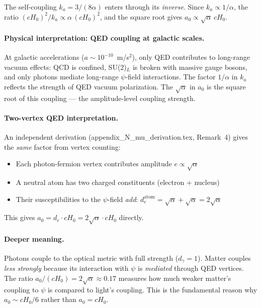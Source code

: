\documentclass[12pt,a4paper]{article}
\newcommand{\Hzero}{H_0}
\begin{document}
The self-coupling $k_a = 3/(8\alpha)$ enters through its \emph{inverse}.
Since $k_a \propto 1/\alpha$, the ratio $(c\Hzero)^2/k_a \propto \alpha\,(c\Hzero)^2$,
and the square root gives $a_0 \propto \sqrt{\alpha}\,c\Hzero$.

\paragraph{Physical interpretation: QED coupling at galactic scales.}
At galactic accelerations ($a \sim 10^{-10}$~m/s$^2$), only QED contributes
to long-range vacuum effects: QCD is confined, SU(2)$_L$ is broken with
massive gauge bosons, and only photons mediate long-range $\psi$-field
interactions. The factor $1/\alpha$ in $k_a$ reflects the strength of QED
vacuum polarization. The $\sqrt{\alpha}$ in $a_0$ is the square root of this
coupling --- the amplitude-level coupling strength.

\paragraph{Two-vertex QED interpretation.}
An independent derivation (appendix\_N\_mu\_derivation.tex, Remark~4)
gives the \emph{same} factor from vertex counting:
\begin{itemize}
\item Each photon-fermion vertex contributes amplitude $e \propto \sqrt{\alpha}$
\item A neutral atom has two charged constituents (electron + nucleus)
\item Their susceptibilities to the $\psi$-field \emph{add}:
  $d_e^{\mathrm{atom}} = \sqrt{\alpha} + \sqrt{\alpha} = 2\sqrt{\alpha}$
\end{itemize}

This gives $a_0 = d_e \cdot c\Hzero = 2\sqrt{\alpha} \cdot c\Hzero$ directly.

\paragraph{Deeper meaning.}
Photons couple to the optical metric with full strength ($d_\gamma = 1$).
Matter couples \emph{less strongly} because its interaction with $\psi$ is
\emph{mediated} through QED vertices. The ratio $a_0/(c\Hzero) = 2\sqrt{\alpha}
\approx 0.17$ measures how much weaker matter's coupling to $\psi$ is
compared to light's coupling. This is the fundamental reason why
$a_0 \sim cH_0/6$ rather than $a_0 = cH_0$.

\end{document}
